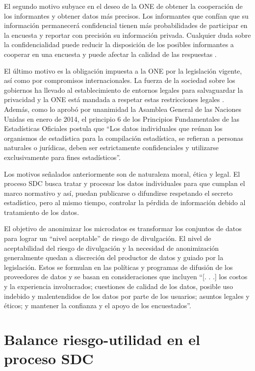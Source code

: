 \documentclass[]{book}
\theoremstyle{definition}
\theoremstyle{definition}
\theoremstyle{definition}
\theoremstyle{definition}
\theoremstyle{remark}
\begin{document}
El segundo motivo subyace en el deseo de la ONE de obtener la cooperación de los informantes y obtener datos más precisos. Los informantes que confían que su información permanecerá confidencial tienen más probabilidades de participar en la encuesta y reportar con precisión su información privada. Cualquier duda sobre la confidencialidad puede reducir la disposición de los posibles informantes a cooperar en una encuesta y puede afectar la calidad de las respuestas \citep{Yazdani}.

El último motivo es la obligación impuesta a la ONE por la legislación vigente, así como por compromisos internacionales. La fuerza de la sociedad sobre los gobiernos ha llevado al establecimiento de entornos legales para salvaguardar la privacidad y la ONE está mandada a respetar estas restricciones legales \citep{Duncan}. Además, como lo aprobó por unanimidad la Asamblea General de las Naciones Unidas en enero de 2014, el principio 6 de los Principios Fundamentales de las Estadísticas Oficiales postula que ``Los datos individuales que reúnan los organismos de estadística para la compilación estadística, se refieran a personas naturales o jurídicas, deben ser estrictamente confidenciales y utilizarse exclusivamente para fines estadísticos''.

Los motivos señalados anteriormente son de naturaleza moral, ética y legal. El proceso SDC busca tratar y procesar los datos individuales para que cumplan el marco normativo y así, puedan publicarse o difundirse respetando el secreto estadístico, pero al mismo tiempo, controlar la pérdida de información debido al tratamiento de los datos.

El objetivo de anonimizar los microdatos es transformar los conjuntos de datos para lograr un ``nivel aceptable'' de riesgo de divulgación. El nivel de aceptabilidad del riesgo de divulgación y la necesidad de anonimización generalmente quedan a discreción del productor de datos y guiado por la legislación. Estos se formulan en las políticas y programas de difusión de los proveedores de datos y se basan en consideraciones que incluyen ``{[}. . .{]} los costos y la experiencia involucrados; cuestiones de calidad de los datos, posible uso indebido y malentendidos de los datos por parte de los usuarios; asuntos legales y éticos; y mantener la confianza y el apoyo de los encuestados''\citep[p.~33]{benschop}.

\hypertarget{balance-riesgo-utilidad-en-el-proceso-sdc}{%
\section{Balance riesgo-utilidad en el proceso SDC}\label{balance-riesgo-utilidad-en-el-proceso-sdc}}
\end{document}
